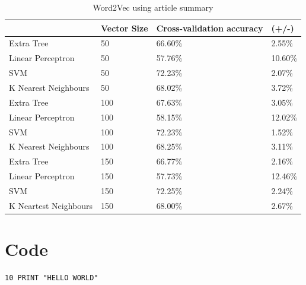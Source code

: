 \documentclass[a4paper,11pt]{report}
\begin{document}
\begin{table}[h!]
\centering
\caption{Word2Vec using article summary}
\label{w2v-article-summary}
\begin{tabular}{|l|l|l|l|}
\hline
                      & Vector Size & Cross-validation accuracy & (+/-)  \\ \hline
Extra Tree            & 50          & 66.60\%                   & 2.55\% \\ \hline
Linear Perceptron     & 50          & 57.76\%                   & 10.60\% \\ \hline
SVM                   & 50          & 72.23\%                   & 2.07\% \\ \hline
K Nearest Neighbours  & 50          & 68.02\%                   & 3.72\% \\ \hline
Extra Tree            & 100         & 67.63\%                   & 3.05\% \\ \hline
Linear Perceptron     & 100         & 58.15\%                   & 12.02\% \\ \hline
SVM                   & 100         & 72.23\%                   & 1.52\% \\ \hline
K Nearest Neighbours  & 100         & 68.25\%                   & 3.11\% \\ \hline
Extra Tree            & 150         & 66.77\%                   & 2.16\% \\ \hline
Linear Perceptron     & 150         & 57.73\%                   & 12.46\% \\ \hline
SVM                   & 150         & 72.25\%                   & 2.24\% \\ \hline
K Neartest Neighbours & 150         & 68.00\%                   & 2.67\% \\ \hline
\end{tabular}
\end{table}

\chapter{Code}
\label{app:code}

\begin{verbatim}
10 PRINT "HELLO WORLD"
\end{verbatim}


\end{document}
